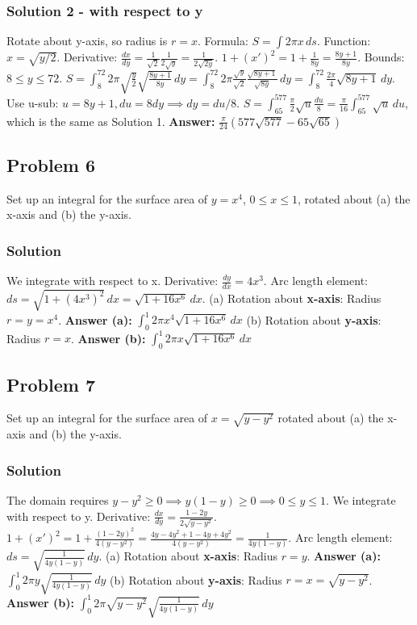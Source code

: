\documentclass{article}
\begin{document}
\subsubsection*{Solution 2 - with respect to y}
Rotate about y-axis, so radius is $r=x$. Formula: $S = \int 2\pi x \,ds$.
Function: $ x = \sqrt{y/2} $. Derivative: $ \frac{dx}{dy} = \frac{1}{\sqrt{2}} \frac{1}{2\sqrt{y}} = \frac{1}{2\sqrt{2y}} $.
$1+(x')^2 = 1 + \frac{1}{8y} = \frac{8y+1}{8y} $.
Bounds: $8 \le y \le 72$.
$ S = \int_8^{72} 2\pi \sqrt{\frac{y}{2}} \sqrt{\frac{8y+1}{8y}} \,dy = \int_8^{72} 2\pi \frac{\sqrt{y}}{\sqrt{2}} \frac{\sqrt{8y+1}}{\sqrt{8y}} \,dy = \int_8^{72} \frac{2\pi}{4} \sqrt{8y+1} \,dy $.
Use u-sub: $u=8y+1, du=8dy \implies dy = du/8$.
$ S = \int_{65}^{577} \frac{\pi}{2} \sqrt{u} \frac{du}{8} = \frac{\pi}{16} \int_{65}^{577} \sqrt{u} \,du $, which is the same as Solution 1.
\textbf{Answer:} $ \frac{\pi}{24}(577\sqrt{577} - 65\sqrt{65}) $

\subsection{Problem 6}
Set up an integral for the surface area of $y=x^4$, $0 \le x \le 1$, rotated about (a) the x-axis and (b) the y-axis.
\subsubsection*{Solution}
We integrate with respect to x.
Derivative: $ \frac{dy}{dx} = 4x^3 $.
Arc length element: $ ds = \sqrt{1+(4x^3)^2} \,dx = \sqrt{1+16x^6} \,dx $.
(a) Rotation about \textbf{x-axis}: Radius $r=y=x^4$.
\textbf{Answer (a):} $ \int_0^1 2\pi x^4 \sqrt{1+16x^6} \,dx $
(b) Rotation about \textbf{y-axis}: Radius $r=x$.
\textbf{Answer (b):} $ \int_0^1 2\pi x \sqrt{1+16x^6} \,dx $

\subsection{Problem 7}
Set up an integral for the surface area of $x = \sqrt{y-y^2}$ rotated about (a) the x-axis and (b) the y-axis.
\subsubsection*{Solution}
The domain requires $y-y^2 \ge 0 \implies y(1-y) \ge 0 \implies 0 \le y \le 1$. We integrate with respect to y.
Derivative: $ \frac{dx}{dy} = \frac{1-2y}{2\sqrt{y-y^2}} $.
$1+(x')^2 = 1 + \frac{(1-2y)^2}{4(y-y^2)} = \frac{4y-4y^2 + 1-4y+4y^2}{4(y-y^2)} = \frac{1}{4y(1-y)} $.
Arc length element: $ ds = \sqrt{\frac{1}{4y(1-y)}} \,dy $.
(a) Rotation about \textbf{x-axis}: Radius $r=y$.
\textbf{Answer (a):} $ \int_0^1 2\pi y \sqrt{\frac{1}{4y(1-y)}} \,dy $
(b) Rotation about \textbf{y-axis}: Radius $r=x=\sqrt{y-y^2}$.
\textbf{Answer (b):} $ \int_0^1 2\pi \sqrt{y-y^2} \sqrt{\frac{1}{4y(1-y)}} \,dy $
\end{document}
